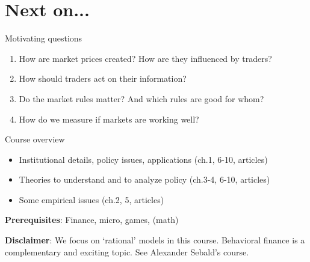 \documentclass[english,10pt
,aspectratio=169
]{beamer}
\begin{document}
\section{Next on...}

\begin{frame}{Motivating questions}
	\begin{enumerate}
		\item How are market prices created? How are they influenced by traders?
		\item How should traders act on their information?
		\item Do the market rules matter? And which rules are good for whom?
		\item How do we measure if markets are working well?
	\end{enumerate}
\end{frame}


\begin{frame}{Course overview}
	\begin{itemize}
		\item Institutional details, policy issues, applications (ch.1, 6-10, articles)
		\item Theories to understand and to analyze policy (ch.3-4, 6-10, articles)
		\item Some empirical issues (ch.2, 5, articles)
	\end{itemize}
	
	\textbf{Prerequisites}: Finance, micro, games, (math)
	
	\textbf{Disclaimer}: We focus on `rational' models in this course.
	Behavioral finance is a complementary and exciting topic. See
	Alexander Sebald's course.
\end{frame}
\end{document}
